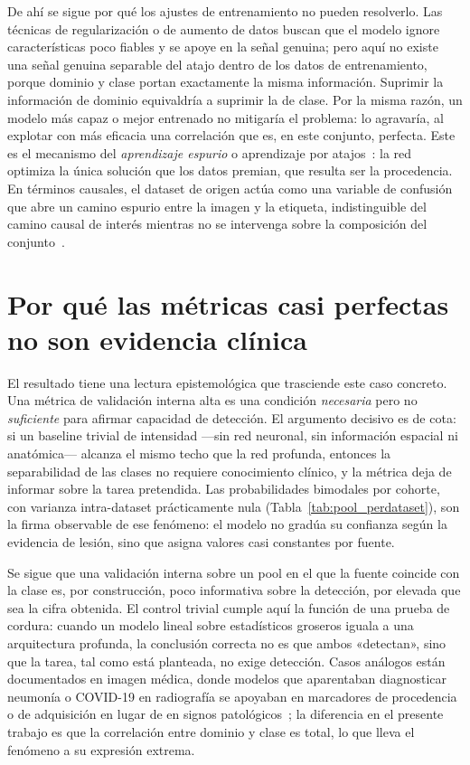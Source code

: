De ahí se sigue por qué los ajustes de entrenamiento no pueden resolverlo. Las
técnicas de regularización o de aumento de datos buscan que el modelo ignore
características poco fiables y se apoye en la señal genuina; pero aquí no existe
una señal genuina separable del atajo dentro de los datos de entrenamiento,
porque dominio y clase portan exactamente la misma información. Suprimir la
información de dominio equivaldría a suprimir la de clase. Por la misma razón, un
modelo más capaz o mejor entrenado no mitigaría el problema: lo agravaría, al
explotar con más eficacia una correlación que es, en este conjunto, perfecta.
Este es el mecanismo del \emph{aprendizaje espurio} o aprendizaje por
atajos~\cite{geirhos2020shortcut}: la red optimiza la única solución que los
datos premian, que resulta ser la procedencia. En términos causales, el dataset
de origen actúa como una variable de confusión que abre un camino espurio entre
la imagen y la etiqueta, indistinguible del camino causal de interés mientras no
se intervenga sobre la composición del conjunto~\cite{castro2020causality}.

\section{Por qué las métricas casi perfectas no son evidencia clínica}

El resultado tiene una lectura epistemológica que trasciende este caso concreto.
Una métrica de validación interna alta es una condición \emph{necesaria} pero no
\emph{suficiente} para afirmar capacidad de detección. El argumento decisivo es
de cota: si un baseline trivial de intensidad ---sin red neuronal, sin
información espacial ni anatómica--- alcanza el mismo techo que la red profunda,
entonces la separabilidad de las clases no requiere conocimiento clínico, y la
métrica deja de informar sobre la tarea pretendida. Las probabilidades bimodales
por cohorte, con varianza intra-dataset prácticamente nula
(Tabla~\ref{tab:pool_perdataset}), son la firma observable de ese fenómeno: el
modelo no gradúa su confianza según la evidencia de lesión, sino que asigna
valores casi constantes por fuente.

Se sigue que una validación interna sobre un pool en el que la fuente coincide
con la clase es, por construcción, poco informativa sobre la detección, por
elevada que sea la cifra obtenida. El control trivial cumple aquí la función de
una prueba de cordura: cuando un modelo lineal sobre estadísticos groseros iguala
a una arquitectura profunda, la conclusión correcta no es que ambos «detectan»,
sino que la tarea, tal como está planteada, no exige detección. Casos análogos
están documentados en imagen médica, donde modelos que aparentaban diagnosticar
neumonía o COVID-19 en radiografía se apoyaban en marcadores de procedencia o de
adquisición en lugar de en signos patológicos~\cite{zech2018pneumonia,degrave2021shortcuts};
la diferencia en el presente trabajo es que la correlación entre dominio y clase
es total, lo que lleva el fenómeno a su expresión extrema.

